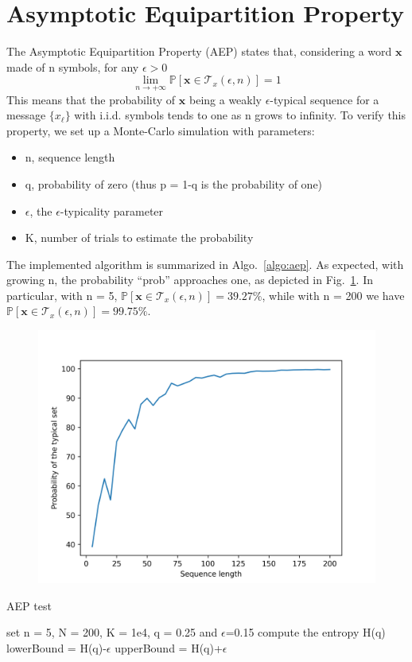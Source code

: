 \documentclass[a4paper]{article}
\begin{document}
	\section{Asymptotic Equipartition Property}
	The Asymptotic Equipartition Property (AEP) states that, considering a word $ \boldsymbol{x} $ made of n symbols, for any $\epsilon > 0$
	\begin{equation}
		\lim_{n\rightarrow+\infty} \mathbb{P}[\boldsymbol{x}\in \mathcal{T}_x(\epsilon,n)] = 1
	\end{equation}
	This means that the probability of $ \boldsymbol{x} $ being a weakly $\epsilon$-typical sequence for a message $ \{x_\ell\} $ with i.i.d. symbols tends to one as n grows to infinity.
	To verify this property, we set up a Monte-Carlo simulation with parameters:
	\begin{itemize}
		\item n, sequence length
		\item q, probability of zero (thus p = 1-q is the probability of one)
		\item $\epsilon$, the $\epsilon$-typicality parameter
		\item K, number of trials to estimate the probability
	\end{itemize}
	The implemented algorithm is summarized in Algo.~\ref{algo:aep}. As expected, with growing n, the probability ``prob'' approaches one, as depicted in Fig.~\ref{fig:aep}. In particular, with n = 5, $ \mathbb{P}[\boldsymbol{x}\in \mathcal{T}_x(\epsilon,n)] = 39.27\% $, while with n = 200 we have $ \mathbb{P}[\boldsymbol{x}\in \mathcal{T}_x(\epsilon,n)] = 99.75\% $.
	\begin{figure}
		\centering
		\includegraphics[width=0.7\linewidth]{aep.png}
		\caption{}
		\label{fig:aep}
	\end{figure}
	\begin{algorithm}
		\SetAlgoLined
		\caption{AEP test}
		set n = 5, N = 200, K = 1e4, q = 0.25 and $\epsilon$=0.15\;
		compute the entropy H(q)\;
		lowerBound = H(q)-$\epsilon$\;
		upperBound = H(q)+$\epsilon$\;
	\label{algo:aep}
	\end{algorithm}
	\newpage
\end{document}
